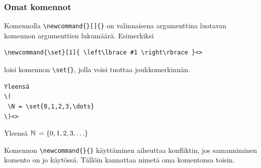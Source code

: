 \begin{frame}[fragile]
    \frametitle{Omat komennot}
    Komennolla \lstinline-\newcommand{}[]{}- on valinnaisena argumenttina luotavan komennon argumenttien lukumäärä. Esimerkiksi
    \begin{lstlisting}
\newcommand{\set}[1]{ \left\lbrace #1 \right\rbrace }<>
    \end{lstlisting}
    loisi komennon \lstinline-\set{}-, jolla voisi tuottaa joukkomerkinnän. 
    \vaihto
    \begin{minipage}{5.3cm}
        \begin{lstlisting}
Yleensä
\(
 \N = \set{0,1,2,3,\dots}
\)<>
        \end{lstlisting}
    \end{minipage}
    \begin{minipage}{4.7cm}
        \begin{serif}
            Yleensä
            \(
                \N = \set{0,1,2,3,\dots}
            \)
        \end{serif}
    \end{minipage}
    \pause
    \vaihto
    Komennon \lstinline-\newcommand{}{}- käyttäminen aiheuttaa konfliktin, jos samanniminen komento on jo käytössä. Tällöin kannattaa nimetä oma komentonsa toisin. 
\end{frame}


